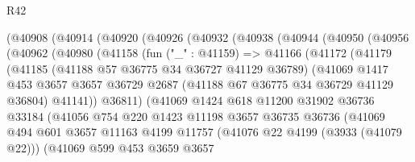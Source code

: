 \begin{lexlean}{R42}
\begin{coremodule}
          (@40908
            (@40914
              (@40920
                (@40926
                  (@40932
                    (@40938
                      (@40944
                        (@40950
                          (@40956
                            (@40962
                              (@40980
                                (@41158
                                  (fun ("_" : @41159) =>
                                  @41166
                                    (@41172
                                      (@41179
                                        (@41185
                                          (@41188 @57 @36775 @34 @36727 @41129 @36789)
                                          (@41069
                                            @1417
                                            @453
                                            @3657
                                            @3657
                                            @36729
                                            @2687
                                            (@41188 @67 @36775 @34 @36729 @41129 @36804)
                                            @41141))
                                        @36811)
                                      (@41069
                                        @1424
                                        @618
                                        @11200
                                        @31902
                                        @36736
                                        @33184
                                        (@41056
                                          @754
                                          @220
                                          @1423
                                          @11198
                                          @3657
                                          @36735
                                          @36736
                                          (@41069
                                            @494
                                            @601
                                            @3657
                                            @11163
                                            @4199
                                            @11757
                                            (@41076 @22 @4199 (@3933 (@41079 @22)))
                                            (@41069
                                              @599
                                              @453
                                              @3659
                                              @3657

\end{coremodule}
\end{lexlean}
